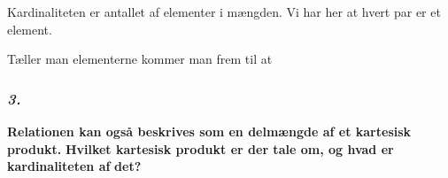 \documentclass{article}
\begin{document}
\begin{Maple Normal}{
}\end{Maple Normal}
\begin{Maple Normal}{
Kardinaliteten er antallet af elementer i mængden. Vi har her at hvert par er et element.}\end{Maple Normal}

\begin{Maple Normal}{
}\end{Maple Normal}
\begin{Maple Normal}{
Tæller man elementerne kommer man frem til at 
}\end{Maple Normal}

\begin{Maple Normal}{
}\end{Maple Normal}
\subsubsection{\textbf{\textit{3. }}
}
\begin{Maple Normal}{
\textbf{Relationen kan også beskrives som en delmængde af et kartesisk produkt.\linebreak
}\textbf{Hvilket kartesisk produkt er der tale om, og hvad er kardinaliteten af\linebreak
}\textbf{det?}}\end{Maple Normal}
\end{document}
